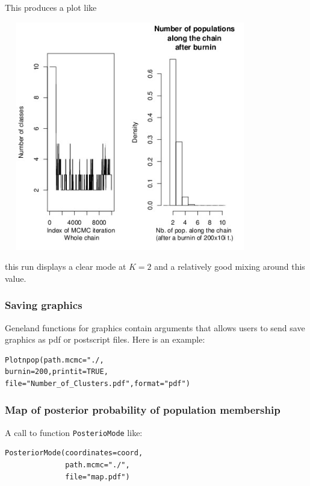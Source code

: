 \documentclass[a4paper,10pt]{article}
\begin{document}
This produces a plot like

\centerline{\includegraphics[height=10cm,width=11cm]{fig/npop.jpeg}}

this run displays a clear mode at $K=2$ and a relatively good mixing around this value.


\subsubsection{Saving graphics}

{\sc Geneland} functions for graphics contain arguments that allows users to send save graphics as pdf or postscript files. 
Here is an example:

\begin{verbatim}
Plotnpop(path.mcmc="./,
burnin=200,printit=TRUE,
file="Number_of_Clusters.pdf",format="pdf")
\end{verbatim}



\clearpage
\subsubsection{Map of posterior probability of population membership}

A call to function \texttt{PosterioMode} like:\\

\begin{verbatim}
PosteriorMode(coordinates=coord,
              path.mcmc="./",
              file="map.pdf")
\end{verbatim}
\end{document}
